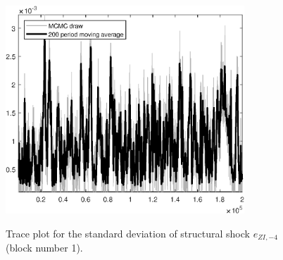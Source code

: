 \begin{figure}[H]
\centering
  \includegraphics[width=0.8\textwidth]{BRS_sectoral_rest/graphs/TracePlot_SE_e_ZI_news_blck_1}\\
    \caption{Trace plot for the standard deviation of structural shock ${e_{ZI,-4}}$ (block number 1).}
\end{figure}
